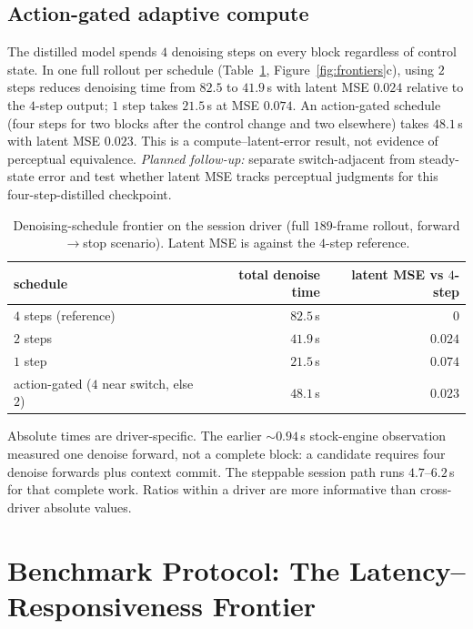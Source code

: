 \documentclass[11pt]{article}
\newcommand{\planned}[1]{\emph{Planned follow-up:} #1}
\begin{document}
\subsection{Action-gated adaptive compute}
\label{sec:adaptive}

The distilled model spends $4$ denoising steps on every block regardless of control state. In one full rollout per schedule (Table~\ref{tab:adaptive}, Figure~\ref{fig:frontiers}c), using $2$ steps reduces denoising time from $82.5$ to $41.9$\,s with latent MSE $0.024$ relative to the $4$-step output; $1$ step takes $21.5$\,s at MSE $0.074$. An action-gated schedule (four steps for two blocks after the control change and two elsewhere) takes $48.1$\,s with latent MSE $0.023$. This is a compute--latent-error result, not evidence of perceptual equivalence. \planned{separate switch-adjacent from steady-state error and test whether latent MSE tracks perceptual judgments for this four-step-distilled checkpoint.}

\begin{table}[t]
\centering
\caption{Denoising-schedule frontier on the session driver (full $189$-frame rollout, forward$\to$stop scenario). Latent MSE is against the $4$-step reference.}
\label{tab:adaptive}
\begin{tabular}{lrr}
\toprule
schedule & total denoise time & latent MSE vs $4$-step \\
\midrule
$4$ steps (reference) & $82.5$\,s & $0$ \\
$2$ steps & $41.9$\,s & $0.024$ \\
$1$ step & $21.5$\,s & $0.074$ \\
action-gated ($4$ near switch, else $2$) & $48.1$\,s & $0.023$ \\
\bottomrule
\end{tabular}
\end{table}

Absolute times are driver-specific. The earlier ${\sim}0.94$\,s stock-engine observation measured one denoise forward, not a complete block: a candidate requires four denoise forwards plus context commit. The steppable session path runs $4.7$--$6.2$\,s for that complete work. Ratios within a driver are more informative than cross-driver absolute values.

\section{Benchmark Protocol: The Latency--Responsiveness Frontier}
\label{sec:bench}
\end{document}
